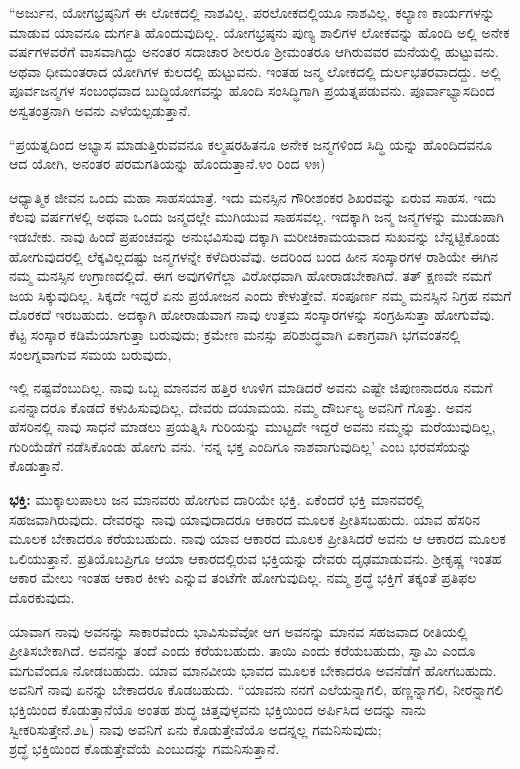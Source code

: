 “ಅರ್ಜುನ, ಯೋಗಭ್ರಷ್ಠನಿಗೆ ಈ ಲೋಕದಲ್ಲಿ ನಾಶವಿಲ್ಲ. ಪರಲೋಕದಲ್ಲಿಯೂ ನಾಶವಿಲ್ಲ. ಕಲ್ಯಾಣ ಕಾರ್ಯಗಳನ್ನು ಮಾಡುವ ಯಾವನೂ ದುರ್ಗತಿ ಹೊಂದುವುದಿಲ್ಲ. ಯೋಗಭ್ರಷ್ಠನು ಪುಣ್ಯ ಶಾಲಿಗಳ ಲೋಕವನ್ನು ಹೊಂದಿ ಅಲ್ಲಿ ಅನೇಕ ವರ್ಷಗಳವರೆಗೆ ವಾಸವಾಗಿದ್ದು ಅನಂತರ ಸದಾಚಾರ ಶೀಲರೂ ಶ್ರೀಮಂತರೂ ಆಗಿರುವವರ ಮನೆಯಲ್ಲಿ ಹುಟ್ಟುವನು. ಅಥವಾ ಧೀಮಂತರಾದ ಯೋಗಿಗಳ ಕುಲದಲ್ಲಿ ಹುಟ್ಟುವನು. ಇಂತಹ ಜನ್ಮ ಲೋಕದಲ್ಲಿ ದುರ್ಲಭತರವಾದದ್ದು. ಅಲ್ಲಿ ಪೂರ್ವಜನ್ಮಗಳ ಸಂಬಂಧವಾದ ಬುದ್ಧಿಯೋಗವನ್ನು ಹೊಂದಿ ಸಂಸಿದ್ಧಿಗಾಗಿ ಪ್ರಯತ್ನಪಡುವನು. ಪೂರ್ವಾಭ್ಯಾಸದಿಂದ ಅಸ್ವತಂತ್ರನಾಗಿ ಅವನು ಎಳೆಯಲ್ಪಡುತ್ತಾನೆ.

“ಪ್ರಯತ್ನದಿಂದ ಅಭ್ಯಾಸ ಮಾಡುತ್ತಿರುವವನೂ ಕಲ್ಮಷರಹಿತನೂ ಅನೇಕ ಜನ್ಮಗಳಿಂದ ಸಿದ್ಧಿ ಯನ್ನು ಹೊಂದಿದವನೂ ಆದ ಯೋಗಿ, ಅನಂತರ ಪರಮಗತಿಯನ್ನು ಹೊಂದುತ್ತಾನೆ.೪ಂ ರಿಂದ ೪೫)

ಆಧ್ಯಾತ್ಮಿಕ ಜೀವನ ಒಂದು ಮಹಾ ಸಾಹಸಯಾತ್ರೆ. ಇದು ಮನಸ್ಸಿನ ಗೌರೀಶಂಕರ ಶಿಖರವನ್ನು ಏರುವ ಸಾಹಸ. ಇದು ಕೆಲವು ವರ್ಷಗಳಲ್ಲಿ ಅಥವಾ ಒಂದು ಜನ್ಮದಲ್ಲೇ ಮುಗಿಯುವ ಸಾಹಸವಲ್ಲ. ಇದಕ್ಕಾಗಿ ಜನ್ಮ ಜನ್ಮಗಳನ್ನು ಮುಡುಪಾಗಿ ಇಡಬೇಕು. ನಾವು ಹಿಂದೆ ಪ್ರಪಂಚವನ್ನು ಅನುಭವಿಸುವು ದಕ್ಕಾಗಿ ಮರೀಚಿಕಾಮಯವಾದ ಸುಖವನ್ನು ಬೆನ್ನಟ್ಟಿಕೊಂಡು ಹೋಗುವುದರಲ್ಲಿ ಲೆಕ್ಕವಿಲ್ಲದಷ್ಟು ಜನ್ಮಗಳನ್ನೇ ಕಳೆದಿರುವೆವು. ಅದರಿಂದ ಬಂದ ಹೀನ ಸಂಸ್ಕಾರಗಳ ರಾಶಿಯೇ ಈಗಿನ ನಮ್ಮ ಮನಸ್ಸಿನ ಉಗ್ರಾಣದಲ್ಲಿದೆ. ಈಗ ಅವುಗಳಿಗೆಲ್ಲಾ ವಿರೋಧವಾಗಿ ಹೋರಾಡಬೇಕಾಗಿದೆ. ತತ್ ಕ್ಷಣವೇ ನಮಗೆ ಜಯ ಸಿಕ್ಕುವುದಿಲ್ಲ. ಸಿಕ್ಕದೇ ಇದ್ದರೆ ಏನು ಪ್ರಯೋಜನ ಎಂದು ಕೇಳುತ್ತೇವೆ. ಸಂಪೂರ್ಣ ನಮ್ಮ ಮನಸ್ಸಿನ ನಿಗ್ರಹ ನಮಗೆ ದೊರಕದೆ ಇರಬಹುದು. ಅದಕ್ಕಾಗಿ ಹೋರಾಡುವಾಗ ನಾವು ಉತ್ತಮ ಸಂಸ್ಕಾರಗಳನ್ನು ಸಂಗ್ರಹಿಸುತ್ತಾ ಹೋಗುವೆವು. ಕೆಟ್ಟ ಸಂಸ್ಕಾರ ಕಡಿಮೆಯಾಗುತ್ತಾ ಬರುವುದು; ಕ್ರಮೇಣ ಮನಸ್ಸು ಪರಿಶುದ್ಧವಾಗಿ ಏಕಾಗ್ರವಾಗಿ ಭಗವಂತನಲ್ಲಿ ಸಂಲಗ್ನವಾಗುವ ಸಮಯ ಬರುವುದು,

ಇಲ್ಲಿ ನಷ್ಟವೆಂಬುದಿಲ್ಲ. ನಾವು ಒಬ್ಬ ಮಾನವನ ಹತ್ತಿರ ಊಳಿಗ ಮಾಡಿದರೆ ಅವನು ಎಷ್ಟೇ ಜಿಪುಣನಾದರೂ ನಮಗೆ ಏನನ್ನಾದರೂ ಕೊಡದೆ ಕಳುಹಿಸುವುದಿಲ್ಲ. ದೇವರು ದಯಾಮಯ. ನಮ್ಮ ದೌರ್ಬಲ್ಯ ಅವನಿಗೆ ಗೊತ್ತು. ಅವನ ಹೆಸರಿನಲ್ಲಿ ನಾವು ಸಾಧನೆ ಮಾಡಲು ಪ್ರಯತ್ನಿಸಿ ಗುರಿಯನ್ನು ಮುಟ್ಟದೇ ಇದ್ದರೆ ಅವನು ನಮ್ಮನ್ನು ಮರೆಯುವುದಿಲ್ಲ, ಗುರಿಯೆಡೆಗೆ ನಡೆಸಿಕೊಂಡು ಹೋಗು ವನು. ‘ನನ್ನ ಭಕ್ತ ಎಂದಿಗೂ ನಾಶವಾಗುವುದಿಲ್ಲ’ ಎಂಬ ಭರವಸೆಯನ್ನು ಕೊಡುತ್ತಾನೆ.

\textbf{ಭಕ್ತಿ:} ಮುಕ್ಕಾಲುಪಾಲು ಜನ ಮಾನವರು ಹೋಗುವ ದಾರಿಯೇ ಭಕ್ತಿ. ಏಕೆಂದರೆ ಭಕ್ತಿ ಮಾನವರಲ್ಲಿ ಸಹಜವಾಗಿರುವುದು. ದೇವರನ್ನು ನಾವು ಯಾವುದಾದರೂ ಆಕಾರದ ಮೂಲಕ ಪ್ರೀತಿಸಬಹುದು. ಯಾವ ಹೆಸರಿನ ಮೂಲಕ ಬೇಕಾದರೂ ಕರೆಯಬಹುದು. ನಾವು ಯಾವ ಆಕಾರದ ಮೂಲಕ ಪ್ರೀತಿಸಿದರೆ ಅವನು ಆ ಆಕಾರದ ಮೂಲಕ ಒಲಿಯುತ್ತಾನೆ. ಪ್ರತಿಯೊಬಪ್ರಿಗೂ ಆಯಾ ಆಕಾರದಲ್ಲಿರುವ ಭಕ್ತಿಯನ್ನು ದೇವರು ದೃಢಮಾಡುವನು. ಶ್ರೀಕೃಷ್ಣ ಇಂತಹ ಆಕಾರ ಮೇಲು ಇಂತಹ ಆಕಾರ ಕೀಳು ಎನ್ನುವ ತಂಟೆಗೇ ಹೋಗುವುದಿಲ್ಲ. ನಮ್ಮ ಶ್ರದ್ಧೆ ಭಕ್ತಿಗೆ ತಕ್ಕಂತೆ ಪ್ರತಿಫಲ ದೊರಕುವುದು.

ಯಾವಾಗ ನಾವು ಅವನನ್ನು ಸಾಕಾರವೆಂದು ಭಾವಿಸುವೆವೋ ಆಗ ಅವನನ್ನು ಮಾನವ ಸಹಜವಾದ ರೀತಿಯಲ್ಲಿ ಪ್ರೀತಿಸಬೇಕಾಗಿದೆ. ಅವನನ್ನು ತಂದೆ ಎಂದು ಕರೆಯಬಹುದು. ತಾಯಿ ಎಂದು ಕರೆಯಬಹುದು, ಸ್ವಾಮಿ ಎಂದೂ ಮಗುವೆಂದೂ ನೋಡಬಹುದು. ಯಾವ ಮಾನವೀಯ ಭಾವದ ಮೂಲಕ ಬೇಕಾದರೂ ಅವನೆಡೆಗೆ ಹೋಗಬಹುದು. ಅವನಿಗೆ ನಾವು ಏನನ್ನು ಬೇಕಾದರೂ ಕೊಡಬಹುದು. “ಯಾವನು ನನಗೆ ಎಲೆಯನ್ನಾಗಲಿ, ಹಣ್ಣನ್ನಾಗಲಿ, ನೀರನ್ನಾಗಲಿ ಭಕ್ತಿಯಿಂದ ಕೊಡುತ್ತಾನೆಯೊ ಅಂತಹ ಶುದ್ಧ ಚಿತ್ತವುಳ್ಳವನು ಭಕ್ತಿಯಿಂದ ಅರ್ಪಿಸಿದ ಅದನ್ನು ನಾನು ಸ್ವೀಕರಿಸುತ್ತೇನೆ.೨೬) ನಾವು ಅವನಿಗೆ ಏನು ಕೊಡುತ್ತೇವೆಯೊ ಅದನ್ನಲ್ಲ ಗಮನಿಸುವುದು;\\ಶ್ರದ್ಧೆ ಭಕ್ತಿಯಿಂದ ಕೊಡುತ್ತೇವೆಯೆ ಎಂಬುದನ್ನು ಗಮನಿಸುತ್ತಾನೆ.

